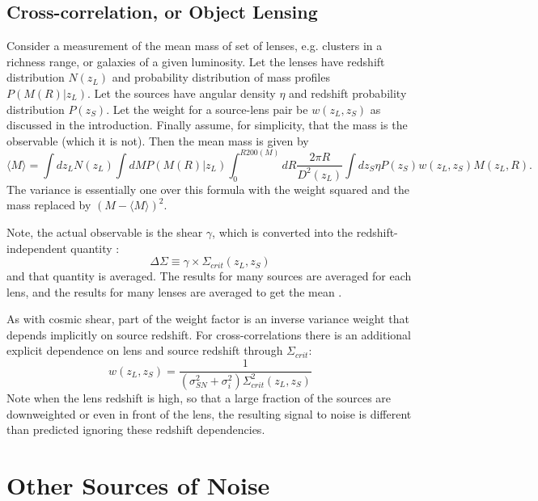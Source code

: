 \documentclass[12pt,preprint]{aastex}
\begin{document}
\subsection{Cross-correlation, or Object Lensing} \label{sec:ccweight}

Consider a measurement of the mean mass of set of lenses, e.g. clusters in a
richness range, or galaxies of a given luminosity. Let the lenses have redshift
distribution $N(z_L)$ and probability distribution of mass profiles
$P(M(R)|z_L)$. Let the sources have angular density $\eta$ and redshift
probability distribution $P(z_S)$.  Let the weight for a source-lens pair be
$w(z_L, z_S)$ as discussed in the introduction.  Finally assume, for
simplicity, that the mass is the observable (which it is not). Then the mean
mass is given by
\begin{equation} \label{eq:meanmass}
\langle M \rangle = 
\int dz_L N(z_L) 
\int dM P(M(R)|z_L) 
\int_0^{R200(M)} dR \frac{2 \pi R}{D^2(z_L)}
\int dz_S \eta P(z_S) w(z_L, z_S) M(z_L, R).
\end{equation}
The variance is essentially one over this formula with the weight
squared and the mass replaced by $(M-\langle M \rangle)^2$.

Note, the actual observable is the shear $\gamma$, which is converted
into the redshift-independent quantity \deltasig:
\begin{equation}
\Delta\Sigma \equiv \gamma \times \Sigma_{crit}(z_L,z_S)
\end{equation}
and that quantity is averaged. The results for many sources are averaged for
each lens, and the results for many lenses are averaged to get the mean
\deltasig.  

As with cosmic shear, part of the weight factor is an inverse variance weight
that depends implicitly on source redshift.  For cross-correlations there is an
additional explicit dependence on lens and source redshift through
$\Sigma_{crit}$:
\begin{equation} \label{eq:wofzl}
    w(z_L, z_S) = 
    \frac
    {1}
    {(\sigma_{SN}^2 + \sigma_{i}^2) \Sigma^2_{crit}(z_L, z_S)}
\end{equation}
Note when the lens redshift is high, so that a large fraction of the sources
are downweighted or even in front of the lens, the resulting signal to noise is
different than predicted ignoring these redshift dependencies.

\section{Other Sources of Noise}
\end{document}
